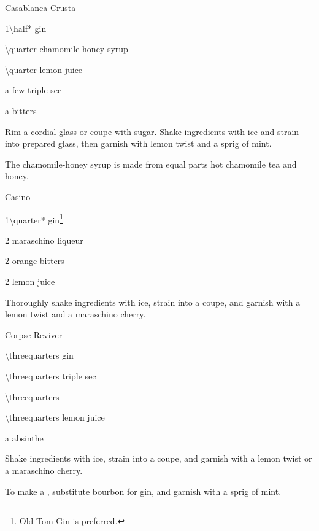 \begin{Cocktail}{Casablanca Crusta}
	\begin{Ingredients}
	\item \SI{1\half*}{\oz} gin
	\item \SI{\quarter}{\oz} chamomile-honey syrup
	\item \SI{\quarter}{\oz} lemon juice
	\item a few \si{\dashes} triple sec
	\item a \si{\dash} bitters
	\end{Ingredients}
	
	\begin{Instructions}
	Rim a cordial glass or coupe with sugar.  Shake ingredients with ice and strain into prepared glass, then garnish with lemon twist and a sprig of mint.
	
	The chamomile-honey syrup is made from equal parts hot chamomile tea and honey.
	\end{Instructions}
\end{Cocktail}

\begin{Cocktail}{Casino}
	\begin{Ingredients}
	\item \SI{1\quarter*}{\oz} gin\footnote{Old Tom Gin is preferred.}
	\item \SI{2}{\tsp} maraschino liqueur
	\item \SI{2}{\tsp} orange bitters
	\item \SI{2}{\tsp} lemon juice
	\item 
	\end{Ingredients}
	
	\begin{Instructions}
	Thoroughly shake ingredients with ice, strain into a coupe, and garnish with a lemon twist and a maraschino cherry.
	\end{Instructions}
\end{Cocktail}

\begin{Cocktail}{Corpse Reviver }
	\begin{Ingredients}
	\item \SI{\threequarters}{\oz} gin
	\item \SI{\threequarters}{\oz} triple sec
	\item \SI{\threequarters}{\oz} \Lillet
	\item \SI{\threequarters}{\oz} lemon juice
	\item a \si{\dash} absinthe
	\end{Ingredients}
	
	\begin{Instructions}\vspace{-3ex}
	Shake ingredients with ice, strain into a coupe, and garnish with a lemon twist or a maraschino cherry.
	
	To make a , substitute bourbon for gin, and garnish with a sprig of mint.
	\end{Instructions}
\end{Cocktail}

